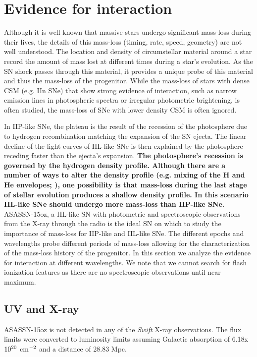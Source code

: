 \documentclass[a4paper,fleqn,usenatbib]{mnras}
\begin{document}
\section{Evidence for interaction} \label{sec:Interaction}
Although it is well known that massive stars undergo significant mass-loss during their lives, the details of this mass-loss (timing, rate, speed, geometry) are not well understood.
The location and density of circumstellar material around a star record the amount of mass lost at different times during a star's evolution. 
As the SN shock passes through this material, it provides a unique probe of this material and thus the mass-loss of the progenitor.
While the mass-loss of stars with dense CSM (e.g. IIn SNe) that show strong evidence of interaction, such as narrow emission lines in photospheric spectra or irregular photometric brightening, is often studied, the mass-loss of SNe with lower density CSM is often ignored.

In IIP-like SNe, the plateau is the result of the recession of the photosphere due to hydrogen recombination matching the expansion of the SN ejecta. 
The linear decline of the light curves of IIL-like SNe is then explained by the photosphere receding faster than the ejecta's expansion. 
\textbf{The photosphere's recession is governed by the hydrogen density profile. 
Although there are a number of ways to alter the density profile (e.g. mixing of the H and He envelopes; \citealt{2017utrobin}), one possibility is that mass-loss during the last stage of stellar evolution produces a shallow density profile. 
In this scenario IIL-like SNe should undergo more mass-loss than IIP-like SNe.} 
ASASSN-15oz, a IIL-like SN with photometric and spectroscopic observations from the X-ray through the radio is the ideal SN on which to study the importance of mass-loss for IIP-like and IIL-like SNe.
The different epochs and wavelengths probe different periods of mass-loss allowing for the characterization of the mass-loss history of the progenitor.
In this section we analyze the evidence for interaction at different wavelengths.
We note that we cannot search for flash ionization features as there are no spectroscopic observations until near maximum.
\subsection{UV and X-ray}
ASASSN-15oz is not detected in any of the \textit{Swift} X-ray observations. 
The flux limits were converted to luminosity limits assuming Galactic absorption of 6.18x$\rm{10^{20}}$ cm$\rm{^{-2}}$ \citep{2005kalberla} and a distance of 28.83 Mpc.
\end{document}
